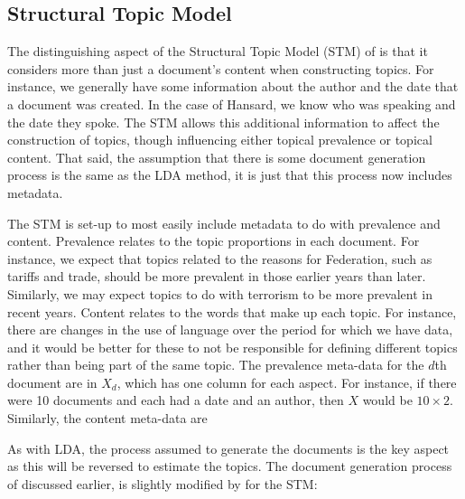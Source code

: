 \documentclass[12pt,]{article}
\theoremstyle{definition}
\theoremstyle{definition}
\theoremstyle{definition}
\theoremstyle{remark}
\begin{document}
\subsection{Structural Topic Model}\label{structural-topic-model}

The distinguishing aspect of the Structural Topic Model (STM) of
\citet{RobertsStewartAiroldi2016} is that it considers more than just a
document's content when constructing topics. For instance, we generally
have some information about the author and the date that a document was
created. In the case of Hansard, we know who was speaking and the date
they spoke. The STM allows this additional information to affect the
construction of topics, though influencing either topical prevalence or
topical content. That said, the assumption that there is some document
generation process is the same as the LDA method, it is just that this
process now includes metadata.

The STM is set-up to most easily include metadata to do with prevalence
and content. Prevalence relates to the topic proportions in each
document. For instance, we expect that topics related to the reasons for
Federation, such as tariffs and trade, should be more prevalent in those
earlier years than later. Similarly, we may expect topics to do with
terrorism to be more prevalent in recent years. Content relates to the
words that make up each topic. For instance, there are changes in the
use of language over the period for which we have data, and it would be
better for these to not be responsible for defining different topics
rather than being part of the same topic. The prevalence meta-data for
the \(d\)th document are in \(X_d\), which has one column for each
aspect. For instance, if there were 10 documents and each had a date and
an author, then \(X\) would be \(10\times 2\). Similarly, the content
meta-data are

As with LDA, the process assumed to generate the documents is the key
aspect as this will be reversed to estimate the topics. The document
generation process of \citet{Blei2003latent} discussed earlier, is
slightly modified by \citet{RobertsStewartAiroldi2016} for the STM:
\end{document}
